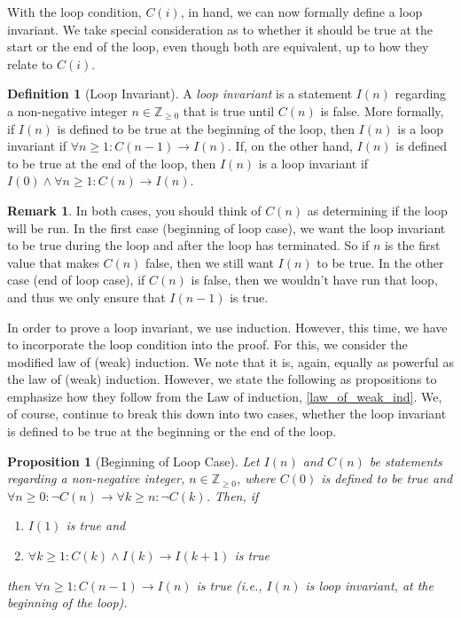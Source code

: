 \documentclass{article}
\theoremstyle{plain}
\newtheorem{proposition}[theorem]{Proposition}
\theoremstyle{definition}
\newtheorem{definition}[theorem]{Definition}
\newtheorem{remark}[theorem]{Remark}
\newcommand{\ra}{\rightarrow}
\newcommand{\ZZ}{\mathbb{Z}_{\geq 0}}
\begin{document}
With the loop condition, \(C(i)\), in hand, we can now formally define a loop invariant. We take special consideration as to whether it should be true at the start or the end of the loop, even though both are equivalent, up to how they relate to \(C(i)\).

\begin{definition}[Loop Invariant]
    A \emph{loop invariant} is a statement \(I(n)\) regarding a non-negative integer \(n \in \ZZ\) that is true until \(C(n)\) is false. More formally, if \(I(n)\) is defined to be true at the beginning of the loop, then \(I(n)\) is a loop invariant if \(\forall n \geq 1 : C(n-1) \ra I(n)\). If, on the other hand, \(I(n)\) is defined to be true at the end of the loop, then \(I(n)\) is a loop invariant if \(I(0) \land \forall n \geq 1 : C(n) \ra I(n)\).
\end{definition}

\begin{remark}
    In both cases, you should think of \(C(n)\) as determining if the loop will be run. In the first case (beginning of loop case), we want the loop invariant to be true during the loop and after the loop has terminated. So if \(n\) is the first value that makes \(C(n)\) false, then we still want \(I(n)\) to be true. In the other case (end of loop case), if \(C(n)\) is false, then we wouldn't have run that loop, and thus we only ensure that \(I(n-1)\) is true. 
\end{remark}

In order to prove a loop invariant, we use induction. However, this time, we have to incorporate the loop condition into the proof. For this, we consider the modified law of (weak) induction. We note that it is, again, equally as powerful as the law of (weak) induction. However, we state the following as propositions to emphasize how they follow from the Law of induction, \cref{law_of_weak_ind}. We, of course, continue to break this down into two cases, whether the loop invariant is defined to be true at the beginning or the end of the loop.

\begin{proposition}[Beginning of Loop Case]\label{law_loop_inv_b}
    Let \(I(n)\) and \(C(n)\) be statements regarding a non-negative integer, \(n \in \ZZ\), where \(C(0)\) is defined to be true and \(\forall n \geq 0: \lnot C(n) \ra \forall k \geq n : \lnot C(k)\). Then, if
    \begin{enumerate}
        \item \(I(1)\) is true and
        \item \(\forall k \geq 1 : C(k) \land I(k) \ra I(k+1)\) is true
    \end{enumerate}    
    then \(\forall n \geq 1 : C(n-1) \ra I(n)\) is true (i.e., \(I(n)\) is loop invariant, at the beginning of the loop).
\end{proposition}
\end{document}

